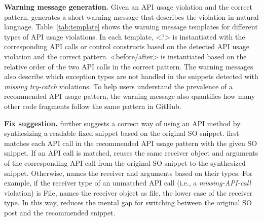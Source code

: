 
{\bf Warning message generation.} Given an API usage violation and the correct pattern, {\tool} generates a short warning message that describes the violation in natural language. Table~\ref{tab:template} shows the warning message templates for different types of API usage violations. In each template, {\textless?\textgreater} is instantiated with the corresponding API calls or control constructs based on the detected API usage violation and the correct pattern. {\textless before/after\textgreater} is instantiated based on the relative order of the two API calls in the correct pattern. The warning messages also describe which exception types are not handled in the snippets detected with {\em missing try-catch} violations. To help users understand the prevalence of a recommended API usage pattern, the warning message also quantifies how many other code fragments follow the same pattern in GitHub. 

{\bf Fix suggestion.} {\tool} further suggests a correct way of using an API method by synthesizing a readable fixed snippet based on the original SO snippet. {\tool} first matches each API call in the recommended API usage pattern with the given SO snippet. If an API call is matched, {\tool} reuses the same receiver object and arguments of the corresponding API call from the original SO snippet to the synthesized snippet. Otherwise, {\tool} names the receiver and arguments based on their types. For example, if the receiver type of an unmatched API call (i.e., a {\em missing-API-call} violation) is {\ttt File}, {\tool} names the receiver object as {\ttt file}, the lower case of the receiver type. In this way, {\tool} reduces the mental gap for switching between the original SO post and the recommended snippet.

